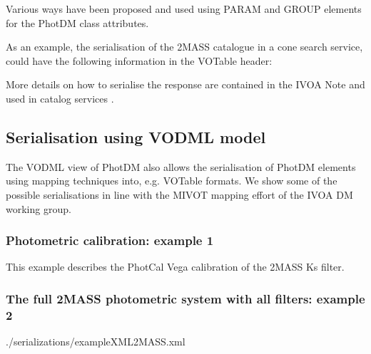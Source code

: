 \documentclass[11pt,a4paper]{ivoa}
\begin{document}
\begin{appendices}
Various ways have been proposed and used using PARAM and GROUP elements for the PhotDM class attributes. 

As an example, the serialisation of the 2MASS catalogue in a cone search service,
could have the following information in the VOTable header:
\par


More details on how to serialise the response are contained in the IVOA Note \citep{derriere} and used in catalog services .

\subsection{Serialisation using VODML model} \label{appendixmapping}
The VODML view of PhotDM also allows the serialisation of PhotDM elements
using mapping techniques into, e.g. VOTable formats. We show some of the possible
serialisations in line with the MIVOT mapping effort of the IVOA DM working group.

\subsubsection{Photometric calibration:  example 1}
This example describes the PhotCal Vega calibration of the 2MASS Ks filter.
\par



 \subsubsection{The full 2MASS photometric system with all filters: example 2}


 {./serializations/exampleXML2MASS.xml}

\end{appendices}


\end{document}
